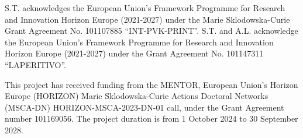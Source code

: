 \documentclass[
  english,        %
  font=times,     %
  onecolumn,      %
]{article}
\begin{document}
 S.T. acknowledges the European Union's Framework Programme for Research and Innovation Horizon Europe (2021-2027) under the Marie Sklodowska-Curie Grant Agreement No. 101107885 “INT-PVK-PRINT”. S.T. and A.L. acknowledge the European Union's Framework Programme for Research and Innovation Horizon Europe (2021-2027) under the Grant Agreement No. 101147311 “LAPERITIVO”.

 This project has received funding from the MENTOR, European Union’s Horizon Europe (HORIZON) Marie Sklodowska-Curie Actions Doctoral Networks (MSCA-DN) HORIZON-MSCA-2023-DN-01 call, under the Grant Agreement number 101169056. The project duration is from 1 October 2024 to 30 September 2028.



\FloatBarrier

\printbibliography
\end{document}
